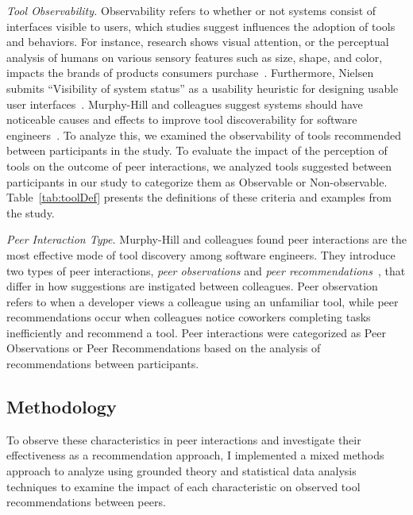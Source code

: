 \textit{Tool Observability.} Observability refers to whether or not systems consist of interfaces visible to users, which studies suggest influences the adoption of tools and behaviors. For instance, research shows visual attention, or the perceptual analysis of humans on various sensory features such as size, shape, and color, impacts the brands of products consumers purchase~\cite{pieters1999visualattention}. Furthermore, Nielsen submits ``Visibility of system status'' as a usability heuristic for designing usable user interfaces~\cite{nielsen1993usability}. Murphy-Hill and colleagues suggest systems should have noticeable causes and effects to improve tool discoverability for software engineers~\cite{Murphy-Hill2015HowDoUsers}. 
To analyze this, we examined the observability of tools recommended between participants in the study. To evaluate the impact of the perception of tools on the outcome of peer interactions, we analyzed tools suggested between participants in our study to categorize them as Observable or Non-observable. Table~\ref{tab:toolDef} presents the definitions of these criteria and examples from the study.

\textit{Peer Interaction Type.} Murphy-Hill and colleagues found peer interactions are the most effective mode of tool discovery among software engineers. They introduce two types of peer interactions, \textit{peer observations} and \textit{peer recommendations}~\cite{Murphy-Hill2011PeerInteraction}, that differ in how suggestions are instigated between colleagues. Peer observation refers to when a developer views a colleague using an unfamiliar tool, while peer recommendations occur when colleagues notice coworkers completing tasks inefficiently and recommend a tool. Peer interactions were categorized as Peer Observations or Peer Recommendations based on the analysis of recommendations between participants.




\subsection{Methodology}

To observe these characteristics in peer interactions and investigate their effectiveness as a recommendation approach, I implemented a mixed methods approach to analyze using grounded theory and statistical data analysis techniques to examine the impact of each characteristic on observed tool recommendations between peers.

